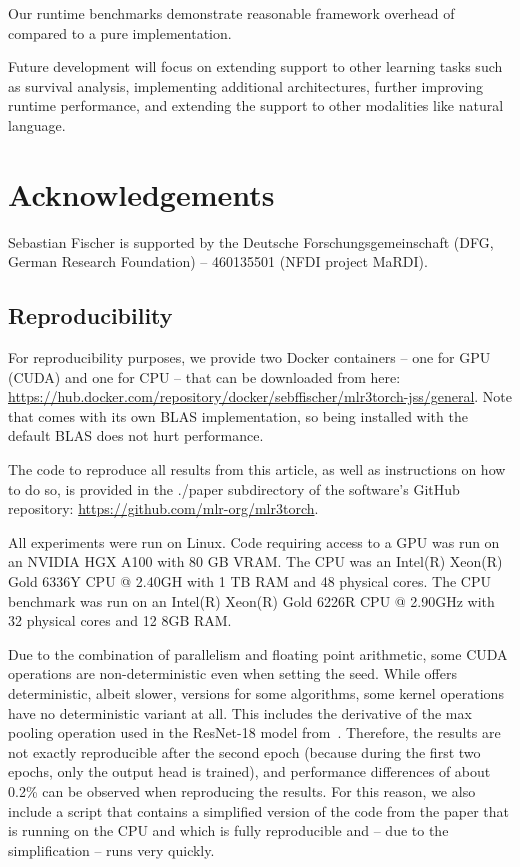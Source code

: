 \documentclass[article]{jss}
\theoremstyle{definition}
\begin{document}
Our runtime benchmarks demonstrate reasonable framework overhead of \mlrttorch{} compared to a pure \torch{} implementation.

Future development will focus on extending support to other learning tasks such as survival analysis, implementing additional architectures, further improving runtime performance, and extending the support to other modalities like natural language.

%

\section*{Acknowledgements}

Sebastian Fischer is supported by the Deutsche Forschungsgemeinschaft (DFG, German Research Foundation) – 460135501 (NFDI project MaRDI).



\begin{appendix}

\newpage
\section{Reproducibility}\label{app:comp-details}

For reproducibility purposes, we provide two Docker containers -- one for GPU (CUDA) and one for CPU -- that can be downloaded from here: \url{https://hub.docker.com/repository/docker/sebffischer/mlr3torch-jss/general}.
Note that \torch{} comes with its own BLAS implementation, so \rlang{} being installed with the default BLAS does not hurt performance.

The code to reproduce all results from this article, as well as instructions on how to do so, is provided in the ./paper subdirectory of the software's GitHub repository: \url{https://github.com/mlr-org/mlr3torch}.

All experiments were run on Linux.
Code requiring access to a GPU was run on an NVIDIA HGX A100 with 80 GB VRAM.
The CPU was an Intel(R) Xeon(R) Gold 6336Y CPU @ 2.40GH with 1 TB RAM and 48 physical cores.
The CPU benchmark was run on an Intel(R) Xeon(R) Gold 6226R CPU @ 2.90GHz with 32 physical cores and 12 8GB RAM.

Due to the combination of parallelism and floating point arithmetic, some CUDA operations are non-deterministic even when setting the seed.
While \libtorch{} offers deterministic, albeit slower, versions for some algorithms, some kernel operations have no deterministic variant at all. This includes the derivative of the max pooling operation used in the ResNet-18 model from~.
Therefore, the results are not exactly reproducible after the second epoch (because during the first two epochs, only the output head is trained), and performance differences of about 0.2\% can be observed when reproducing the results.
For this reason, we also include a script that contains a simplified version of the code from the paper that is running on the CPU and which is fully reproducible and -- due to the simplification -- runs very quickly.
\end{appendix}
\end{document}
